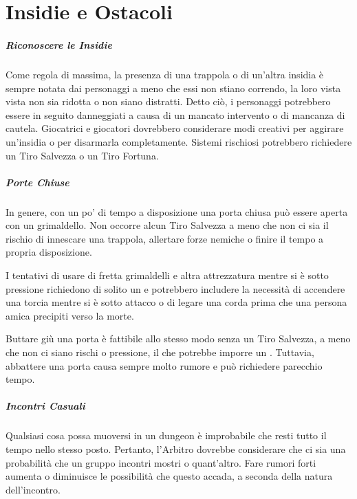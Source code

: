 \documentclass[itdr]{subfiles}
\begin{document}
\chapter{Insidie e Ostacoli}
\label{ch:Insidie_e_ostacoli}

\paragraph{Riconoscere le Insidie}
Come regola di massima, la presenza di una trappola o di un'altra insidia è sempre notata dai personaggi a meno che essi non stiano correndo, la loro vista vista non sia ridotta o non siano distratti. Detto ciò, i personaggi potrebbero essere in seguito danneggiati a causa di un mancato intervento o di mancanza di cautela. Giocatrici e giocatori dovrebbero considerare modi creativi per aggirare un'insidia o per disarmarla completamente. Sistemi rischiosi potrebbero richiedere un Tiro Salvezza o un Tiro Fortuna.

\vfill
\paragraph{Porte Chiuse}
In genere, con un po' di tempo a disposizione una porta chiusa può essere aperta con un grimaldello. Non occorre alcun Tiro Salvezza a meno che non ci sia il rischio di innescare una trappola, allertare forze nemiche o finire il tempo a propria disposizione.

I tentativi di usare di fretta grimaldelli e altra attrezzatura mentre si è sotto pressione richiedono di solito un  e potrebbero includere la necessità di accendere una torcia mentre si è sotto attacco o di legare una corda prima che una persona amica precipiti verso la morte.

Buttare giù una porta è fattibile allo stesso modo senza un Tiro Salvezza, a meno che non ci siano rischi o pressione, il che potrebbe imporre un . Tuttavia, abbattere una porta causa sempre molto rumore e può richiedere parecchio tempo.

\vfill
\paragraph{Incontri Casuali}
Qualsiasi cosa possa muoversi in un dungeon è improbabile che resti tutto il tempo nello stesso posto. Pertanto, l'Arbitro dovrebbe considerare che ci sia una probabilità che un gruppo incontri mostri o quant'altro. Fare rumori forti aumenta o diminuisce le possibilità che questo accada, a seconda della natura dell'incontro.
\end{document}
